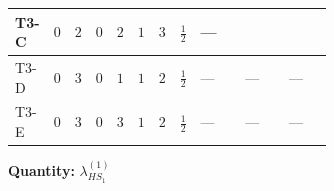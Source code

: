 \documentclass[8pt]{article}
\begin{document}
\begin{landscape}
\begin{longtable}{@{}llcccccc >{\raggedright\arraybackslash}p{0.21\linewidth} >{\raggedright\arraybackslash}p{0.21\linewidth} >{\raggedright\arraybackslash}p{0.21\linewidth}@{}}
\midrule
T3-C & $0$ & $2$ & $0$ & $2$ & $1$ & $3$ & $\frac{1}{2}$ & --- & \scriptsize\adjustbox{max width=\linewidth}{$\begin{gathered} +\frac{9 {g_2}^4}{4}\end{gathered}$} & \scriptsize\adjustbox{max width=\linewidth}{$\begin{gathered} -9 {g_2}^2 {\lambda_{HS_1}^{(1)}}\end{gathered}$} \\
\midrule
T3-D & $0$ & $3$ & $0$ & $1$ & $1$ & $2$ & $\frac{1}{2}$ & --- & --- & --- \\
\midrule
T3-E & $0$ & $3$ & $0$ & $3$ & $1$ & $2$ & $\frac{1}{2}$ & --- & --- & --- \\
\midrule
\bottomrule
\end{longtable}
\clearpage
\noindent\textbf{Quantity: }$\lambda_{HS_1}^{(1)}$\par\smallskip

\end{landscape}
\end{document}
